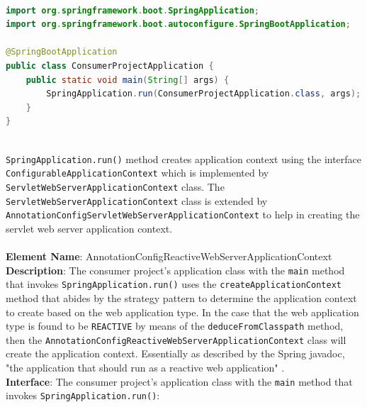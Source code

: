 {\begin{lstlisting}[language=Java, caption=Creating application context for servlet-based web application, label=AnnotationConfigServletWebServerApplicationContext]

import org.springframework.boot.SpringApplication;
import org.springframework.boot.autoconfigure.SpringBootApplication;

@SpringBootApplication
public class ConsumerProjectApplication {
    public static void main(String[] args) {
        SpringApplication.run(ConsumerProjectApplication.class, args);
    }
}
\end{lstlisting}\ \\

\texttt{SpringApplication.run()} method creates application context using the interface \texttt{ConfigurableApplicationContext} which is implemented by  \texttt{ServletWebServerApplicationContext} class. The \texttt{ServletWebServerApplicationContext} class is extended by \texttt{AnnotationConfigServletWebServerApplicationContext} to help in creating the servlet web server application context.\\

\noindent\makebox[\linewidth]{\rule{\textwidth}{3pt}}\ \\

\textbf{Element Name}: AnnotationConfigReactiveWebServerApplicationContext\\
\textbf{Description}: The consumer project's application class with the \texttt{main} method that invokes \texttt{SpringApplication.run()} uses the \texttt{createApplicationContext} method that abides by the strategy pattern to determine the application context to create based on the web application type.
In the case that the web application type is found to be \texttt{REACTIVE} by means of the \texttt{deduceFromClasspath} method, then the \texttt{AnnotationConfigReactiveWebServerApplicationContext} class will create the application context. Essentially as described by the Spring javadoc, "the application that should run as a reactive web application" \cite{springjavadoc:onlineAnnotationConfigReactiveWebServerApplicationContext}.\\
\textbf{Interface}: The consumer project's application class with the \texttt{main} method that invokes \texttt{SpringApplication.run()}:\\

\clearpage

\begin{lstlisting}[language=Java, caption=Creating application context for reactive web application, label=AnnotationConfigReactiveWebServerApplicationContext]


\end{lstlisting}}
